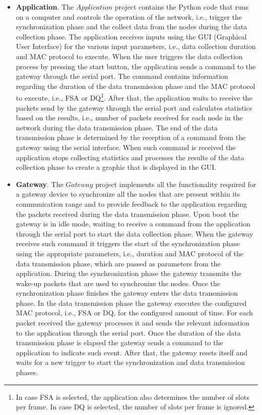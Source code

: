 \begin{itemize}
\item \textbf{Application}. The $Application$ project contains the Python code that runs on a computer and controls the operation of the network, i.e., trigger the synchronization phase and the collect data from the nodes during the data collection phase. The application receives inputs using the GUI (Graphical User Interface) for the various input parameters, i.e., data collection duration and MAC protocol to execute. When the user triggers the data collection process by pressing the start button, the application sends a command to the gateway through the serial port. The command contains information regarding the duration of the data transmission phase and the MAC protocol to execute, i.e., FSA or DQ\footnote{In case FSA is selected, the application also determines the number of slots per frame. In case DQ is selected, the number of slots per frame is ignored.}. After that, the application waits to receive the packets send by the gateway through the serial port and calculates statistics based on the results, i.e., number of packets received for each node in the network during the data transmission phase. The end of the data transmission phase is determined by the reception of a command from the gateway using the serial interface. When such command is received the application stops collecting statistics and processes the results of the data collection phase to create a graphic that is displayed in the GUI.

\item \textbf{Gateway}. The $Gateway$ project implements all the functionality required for a gateway device to synchronize all the nodes that are present within its communication range and to provide feedback to the application regarding the packets received during the data transmission phase. Upon boot the gateway is in idle mode, waiting to receive a command from the application through the serial port to start the data collection phase. When the gateway receives such command it triggers the start of the synchronization phase using the appropriate parameters, i.e., duration and MAC protocol of the data transmission phase, which are passed as parameters from the application. During the synchronization phase the gateway transmits the wake-up packets that are used to synchronize the nodes. Once the synchronization phase finishes the gateway enters the data transmission phase. In the data transmission phase the gateway executes the configured MAC protocol, i.e., FSA or DQ, for the configured amount of time. For each packet received the gateway processes it and sends the relevant information to the application through the serial port. Once the duration of the data transmission phase is elapsed the gateway sends a command to the application to indicate such event. After that, the gateway resets itself and waits for a new trigger to start the synchronization and data transmission phases.


\end{itemize}
